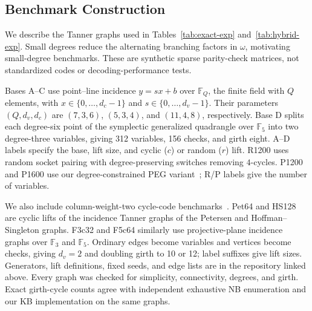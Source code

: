 \subsection{Benchmark Construction}
We describe the Tanner graphs used in
Tables~\ref{tab:exact-exp} and~\ref{tab:hybrid-exp}.
Small degrees reduce the alternating branching factors in $\omega$,
motivating small-degree benchmarks. These are synthetic sparse
parity-check matrices, not standardized codes or decoding-performance tests.

Bases A--C use point--line incidence $y=sx+b$ over $\mathbb F_Q$,
the finite field with $Q$ elements, with
$x\in\{0,\ldots,d_c-1\}$ and $s\in\{0,\ldots,d_v-1\}$.
Their parameters $(Q,d_v,d_c)$ are $(7,3,6)$, $(5,3,4)$, and
$(11,4,8)$, respectively. Base D splits each degree-six point of the
symplectic generalized quadrangle over $\mathbb F_5$ into two
 degree-three variables, giving 312 variables, 156 checks, and girth eight.
A--D labels specify the base, lift size, and cyclic ($c$) or random ($r$) lift.
R1200 uses random socket pairing with degree-preserving switches removing
$4$-cycles. P1200 and P1600 use our degree-constrained PEG
variant~\cite{hu2005}; R/P labels give the number of variables.

We also include column-weight-two cycle-code benchmarks~\cite{malema2007}.
Pet64 and HS128 are cyclic lifts of the incidence Tanner graphs of the
Petersen and Hoffman--Singleton graphs. F3c32 and F5c64 similarly use
projective-plane incidence graphs over $\mathbb F_3$ and $\mathbb F_5$.
Ordinary edges become variables and vertices become checks, giving
$d_v=2$ and doubling girth to 10 or 12; label suffixes give lift sizes.
Generators, lift definitions, fixed seeds, and edge lists are in the
repository linked above. Every graph was checked for simplicity,
connectivity, degrees, and girth. Exact girth-cycle counts agree with
independent exhaustive NB enumeration and our KB implementation
on the same graphs.

